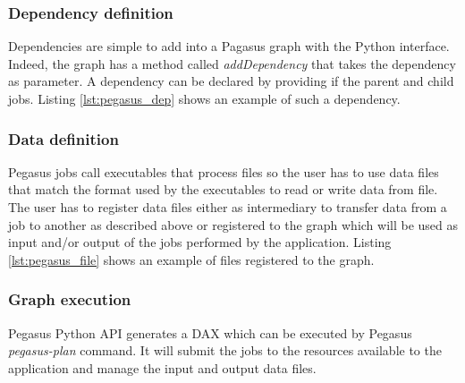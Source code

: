 \begin{figure}[h]

\end{figure}

\subsubsection{Dependency definition}
Dependencies are simple to add into a Pagasus graph with the Python interface.
Indeed, the graph has a method called \textit{addDependency} that takes the dependency as parameter.
A dependency can be declared by providing if the parent and child jobs.
Listing \ref{lst:pegasus_dep} shows an example of such a dependency.

\begin{figure}[h]

\end{figure}

\subsubsection{Data definition}

Pegasus jobs call executables that process files so the user has to use data files that match the format used by the executables to read or write data from file.
The user has to register data files either as intermediary to transfer data from a job to another as described above or registered to the graph which will be used as input and/or output of the jobs performed by the application.
Listing \ref{lst:pegasus_file} shows an example of files registered to the graph.

\begin{figure}[h]

\end{figure}

\subsubsection{Graph execution}
Pegasus Python API generates a DAX which can be executed by Pegasus \textit{pegasus-plan} command.
It will submit the jobs to the resources available to the application and manage the input and output data files.

